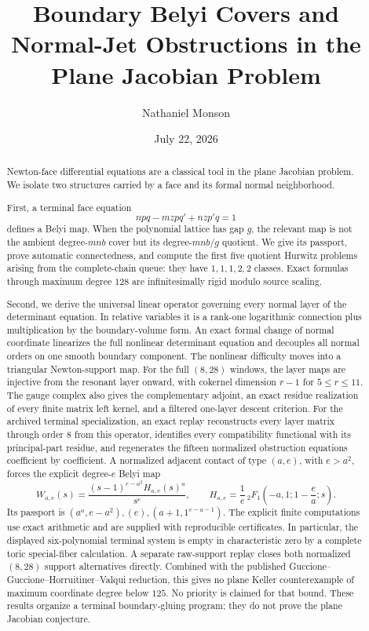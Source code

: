 \documentclass[11pt,reqno]{amsart}
\title[Boundary Belyi covers and normal jets]{Boundary Belyi Covers and
Normal-Jet Obstructions in the Plane Jacobian Problem}
\author{Nathaniel Monson}
\date{July 22, 2026}
\begin{document}
\begin{abstract}
Newton-face differential equations are a classical tool in the plane
Jacobian problem.  We isolate two structures carried by a face and its
formal normal neighborhood.

First, a terminal face equation
\[
npq-mzpq'+nzp'q=1
\]
defines a Belyi map.  When the polynomial lattice has gap \(g\), the relevant
map is not the ambient degree-\(mnb\) cover but its degree-\(mnb/g\)
quotient.  We give its passport, prove automatic connectedness, and compute
the first five quotient Hurwitz problems arising from the complete-chain
queue: they have \(1,1,1,2,2\) classes.  Exact formulas through maximum
degree \(128\) are infinitesimally rigid modulo source scaling.

Second, we derive the universal linear operator governing every normal
layer of the determinant equation.  In relative variables it is a rank-one
logarithmic connection plus multiplication by the boundary-volume form.
An exact formal change of normal coordinate linearizes the full nonlinear
determinant equation and decouples all normal orders on one smooth boundary
component.  The nonlinear difficulty moves into a triangular Newton-support
map.  For the full \((8,28)\) windows, the layer maps are injective from the
resonant layer onward, with cokernel dimension \(r-1\) for
\(5\le r\le11\).  The gauge complex also gives the complementary adjoint,
an exact residue realization of every finite matrix left kernel, and a
filtered one-layer descent criterion.  For the archived terminal
specialization, an exact replay reconstructs every layer matrix through
order \(8\) from this operator, identifies every compatibility functional
with its principal-part residue, and regenerates the fifteen normalized
obstruction equations coefficient by coefficient.  A normalized adjacent contact of
type \((a,e)\), with \(e>a^2\), forces the explicit degree-\(e\) Belyi map
\[
W_{a,e}(s)=\frac{(s-1)^{e-a^2}H_{a,e}(s)^a}{s^e},
\qquad
H_{a,e}=\frac1e\,{}_2F_1\!\left(-a,1;1-\frac ea;s\right).
\]
Its passport is
\((a^a,e-a^2),(e),(a+1,1^{e-a-1})\).
The explicit finite computations use exact arithmetic and are supplied with
reproducible certificates.  In particular, the displayed six-polynomial
terminal system is empty in characteristic zero by a complete toric
special-fiber calculation.  A separate raw-support replay closes both
normalized \((8,28)\) support alternatives directly.  Combined with the
published Guccione--Guccione--Horruitiner--Valqui reduction, this gives no
plane Keller counterexample of maximum coordinate degree below \(125\).
No priority is claimed for that bound.  These results organize a terminal
boundary-gluing program; they do not prove the plane Jacobian conjecture.
\end{abstract}
\end{document}
